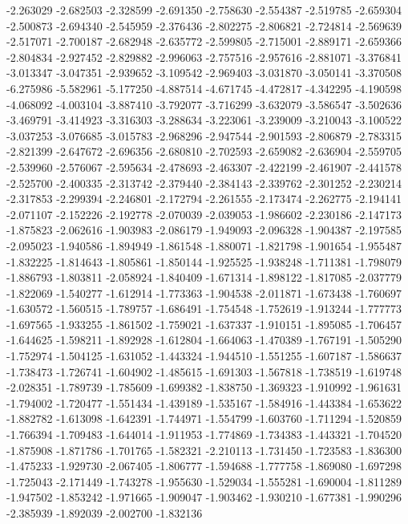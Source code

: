 -2.263029
-2.682503
-2.328599
-2.691350
-2.758630
-2.554387
-2.519785
-2.659304
-2.500873
-2.694340
-2.545959
-2.376436
-2.802275
-2.806821
-2.724814
-2.569639
-2.517071
-2.700187
-2.682948
-2.635772
-2.599805
-2.715001
-2.889171
-2.659366
-2.804834
-2.927452
-2.829882
-2.996063
-2.757516
-2.957616
-2.881071
-3.376841
-3.013347
-3.047351
-2.939652
-3.109542
-2.969403
-3.031870
-3.050141
-3.370508
-6.275986
-5.582961
-5.177250
-4.887514
-4.671745
-4.472817
-4.342295
-4.190598
-4.068092
-4.003104
-3.887410
-3.792077
-3.716299
-3.632079
-3.586547
-3.502636
-3.469791
-3.414923
-3.316303
-3.288634
-3.223061
-3.239009
-3.210043
-3.100522
-3.037253
-3.076685
-3.015783
-2.968296
-2.947544
-2.901593
-2.806879
-2.783315
-2.821399
-2.647672
-2.696356
-2.680810
-2.702593
-2.659082
-2.636904
-2.559705
-2.539960
-2.576067
-2.595634
-2.478693
-2.463307
-2.422199
-2.461907
-2.441578
-2.525700
-2.400335
-2.313742
-2.379440
-2.384143
-2.339762
-2.301252
-2.230214
-2.317853
-2.299394
-2.246801
-2.172794
-2.261555
-2.173474
-2.262775
-2.194141
-2.071107
-2.152226
-2.192778
-2.070039
-2.039053
-1.986602
-2.230186
-2.147173
-1.875823
-2.062616
-1.903983
-2.086179
-1.949093
-2.096328
-1.904387
-2.197585
-2.095023
-1.940586
-1.894949
-1.861548
-1.880071
-1.821798
-1.901654
-1.955487
-1.832225
-1.814643
-1.805861
-1.850144
-1.925525
-1.938248
-1.711381
-1.798079
-1.886793
-1.803811
-2.058924
-1.840409
-1.671314
-1.898122
-1.817085
-2.037779
-1.822069
-1.540277
-1.612914
-1.773363
-1.904538
-2.011871
-1.673438
-1.760697
-1.630572
-1.560515
-1.789757
-1.686491
-1.754548
-1.752619
-1.913244
-1.777773
-1.697565
-1.933255
-1.861502
-1.759021
-1.637337
-1.910151
-1.895085
-1.706457
-1.644625
-1.598211
-1.892928
-1.612804
-1.664063
-1.470389
-1.767191
-1.505290
-1.752974
-1.504125
-1.631052
-1.443324
-1.944510
-1.551255
-1.607187
-1.586637
-1.738473
-1.726741
-1.604902
-1.485615
-1.691303
-1.567818
-1.738519
-1.619748
-2.028351
-1.789739
-1.785609
-1.699382
-1.838750
-1.369323
-1.910992
-1.961631
-1.794002
-1.720477
-1.551434
-1.439189
-1.535167
-1.584916
-1.443384
-1.653622
-1.882782
-1.613098
-1.642391
-1.744971
-1.554799
-1.603760
-1.711294
-1.520859
-1.766394
-1.709483
-1.644014
-1.911953
-1.774869
-1.734383
-1.443321
-1.704520
-1.875908
-1.871786
-1.701765
-1.582321
-2.210113
-1.731450
-1.723583
-1.836300
-1.475233
-1.929730
-2.067405
-1.806777
-1.594688
-1.777758
-1.869080
-1.697298
-1.725043
-2.171449
-1.743278
-1.955630
-1.529034
-1.555281
-1.690004
-1.811289
-1.947502
-1.853242
-1.971665
-1.909047
-1.903462
-1.930210
-1.677381
-1.990296
-2.385939
-1.892039
-2.002700
-1.832136

